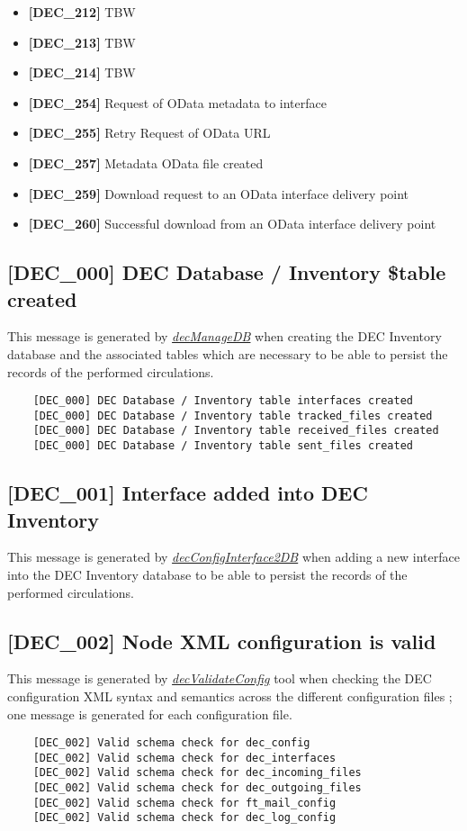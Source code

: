 \documentclass[dec_sum_main.tex]{subfiles}
\begin{document}
\begin{itemize}
	\item \textbf{[DEC\_212]} TBW
	\item \textbf{[DEC\_213]} TBW
	\item \textbf{[DEC\_214]} TBW
    \item \textbf{[DEC\_254]} Request of OData metadata to interface
    \item \textbf{[DEC\_255]} Retry Request of OData URL		
    \item \textbf{[DEC\_257]} Metadata OData file created	
    \item \textbf{[DEC\_259]} Download request to an OData interface delivery point
    \item \textbf{[DEC\_260]} Successful download from an OData interface delivery point  		
\end{itemize}

\label{DEC000}
\subsection{[DEC\_000] DEC Database / Inventory \$table created}
This message is generated by \hyperref[decManageDB]{\textit{decManageDB}} when creating the DEC Inventory database and the associated tables which are necessary to be able to persist the records of the performed circulations.
\begin{verbatim}
	[DEC_000] DEC Database / Inventory table interfaces created
	[DEC_000] DEC Database / Inventory table tracked_files created
	[DEC_000] DEC Database / Inventory table received_files created
	[DEC_000] DEC Database / Inventory table sent_files created
\end{verbatim}

\label{DEC001}
\subsection{[DEC\_001] Interface added into DEC Inventory}
This message is generated by \hyperref[decConfigInterface2DB]{\textit{decConfigInterface2DB}} when adding a new interface into the DEC Inventory database to be able to persist the records of the performed circulations.

\label{DEC002}
\subsection{[DEC\_002] Node XML configuration is valid}
This message is generated by \hyperref[decValidateConfig]{\textit{decValidateConfig}} tool when checking the DEC configuration XML syntax and semantics across the different configuration files ; one message is generated for each configuration file.
\begin{verbatim}
	[DEC_002] Valid schema check for dec_config
	[DEC_002] Valid schema check for dec_interfaces
	[DEC_002] Valid schema check for dec_incoming_files
	[DEC_002] Valid schema check for dec_outgoing_files
	[DEC_002] Valid schema check for ft_mail_config
	[DEC_002] Valid schema check for dec_log_config
\end{verbatim}
\end{document}
